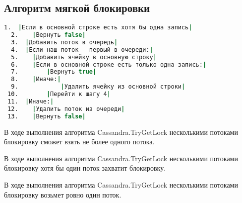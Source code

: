 \subsection{Алгоритм мягкой блокировки}

\begin{lstlisting}[language=csh,caption={Алгоритм Cassandra.TryGetLock(lockId, threadId)}]
  1.  |Если в основной строке есть хотя бы одна запись|
  2.  	|Вернуть false|
  3.  |Добавить поток в очередь|
  4.  |Если наш поток - первый в очереди:|
  5.  	|Добавить ячейку в основную строку|
  6.  	|Если в основной строке есть только одна запись:|
  7.  		|Вернуть true|
  8.  	|Иначе:|
  9.  			|Удалить ячейку из основной строки|
 10.  		|Перейти к шагу 4|
 11.  |Иначе:|
 12.  	|Удалить поток из очереди|
 13.  	|Вернуть false|
\end{lstlisting}

\begin{claim}
В ходе выполнения алгоритма Cassandra.TryGetLock несколькими потоками блокировку сможет взять не более одного потока.
\end{claim}

\begin{claim}
В ходе выполнения алгоритма Cassandra.TryGetLock несколькими потоками блокировку хотя бы один поток захватит блокировку.
\end{claim}

\begin{theorem}
В ходе выполнения алгоритма Cassandra.TryGetLock несколькими потоками блокировку возьмет ровно один поток.
\end{theorem}